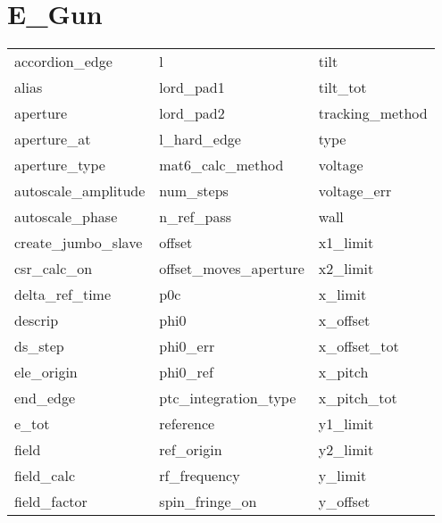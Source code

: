  \section{E_Gun}
 \label{s:list.e.gun}
 
 \begin{tabular}{lll} \toprule
accordion_edge              & l                           & tilt                        \\
alias                       & lord_pad1                   & tilt_tot                    \\
aperture                    & lord_pad2                   & tracking_method             \\
aperture_at                 & l_hard_edge                 & type                        \\
aperture_type               & mat6_calc_method            & voltage                     \\
autoscale_amplitude         & num_steps                   & voltage_err                 \\
autoscale_phase             & n_ref_pass                  & wall                        \\
create_jumbo_slave          & offset                      & x1_limit                    \\
csr_calc_on                 & offset_moves_aperture       & x2_limit                    \\
delta_ref_time              & p0c                         & x_limit                     \\
descrip                     & phi0                        & x_offset                    \\
ds_step                     & phi0_err                    & x_offset_tot                \\
ele_origin                  & phi0_ref                    & x_pitch                     \\
end_edge                    & ptc_integration_type        & x_pitch_tot                 \\
e_tot                       & reference                   & y1_limit                    \\
field                       & ref_origin                  & y2_limit                    \\
field_calc                  & rf_frequency                & y_limit                     \\
field_factor                & spin_fringe_on              & y_offset                    \\

\end{tabular}
